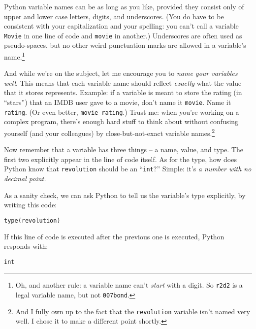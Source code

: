 Python variable names can be as long as you like, provided they consist only of
upper and lower case letters, digits, and underscores. (You do have to be
consistent with your capitalization and your spelling: you can't call a
variable \texttt{Movie} in one line of code and \texttt{movie} in another.)
Underscores are often used as pseudo-spaces, but no other weird punctuation
marks are allowed in a variable's name.\footnote{Oh, and another rule: a
variable name can't \textit{start} with a digit. So \texttt{r2d2} is a legal
variable name, but not \texttt{007bond}.}

And while we're on the subject, let me encourage you to \textit{name your
variables well}. This means that each variable name should reflect
\textit{exactly} what the value that it stores represents. Example: if a
variable is meant to store the rating (in ``stars'') that an IMDB user gave to
a movie, don't name it \texttt{movie}. Name it \texttt{rating}. (Or even
better, \texttt{movie\_rating}.) Trust me: when you're working on a complex
program, there's enough hard stuff to think about without confusing yourself
(and your colleagues) by close-but-not-exact variable names.\footnote{And I
fully own up to the fact that the \texttt{revolution} variable isn't named very
well. I chose it to make a different point shortly.}

Now remember that a variable has three things -- a name, value, and type. The
first two explicitly appear in the line of code itself. As for the type, how
does Python know that \texttt{revolution} should be an ``\texttt{int}?''
Simple: it's \textit{a number with no decimal point.}

As a sanity check, we can ask Python to tell us the variable's type explicitly,
by writing this code:

\label{typeFunction}
\begin{Verbatim}[fontsize=\small,samepage=true,frame=single,framesep=3mm]
type(revolution)
\end{Verbatim}

If this line of code is executed after the previous one is executed, Python
responds with:

\begin{Verbatim}[fontsize=\small,samepage=true,frame=leftline,framesep=5mm,framerule=1mm]
int
\end{Verbatim}


